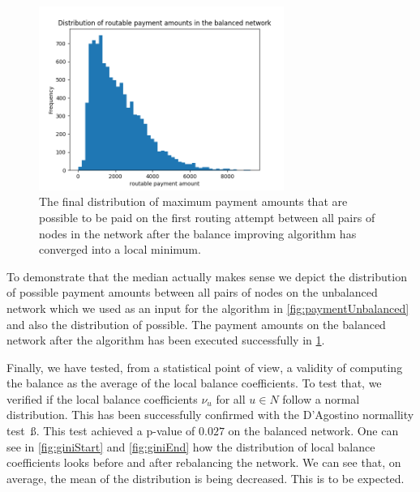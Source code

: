 \documentclass[a4paper]{paper}
\begin{document}
\begin{figure}
 \centering
 \includegraphics[width=8cm]{code/results/routabilityTest/paymentamtBalanced.png}
 \caption{The final distribution of maximum payment amounts that are possible to be paid on the first routing attempt between all pairs of nodes in the network after the balance improving algorithm has converged into a local minimum.}
 \label{fig:paymentBalanced}
\end{figure}

To demonstrate that the median actually makes sense we depict 
the distribution of possible payment amounts between all pairs
of nodes on the unbalanced network which we used as an input for 
the algorithm in \cref{fig:paymentUnbalanced} and also the distribution of possible. 
The payment amounts on the balanced network after the algorithm has been executed 
successfully in \cref{fig:paymentBalanced}.

Finally, we have tested, from a statistical point of view, a validity of computing the balance as the average of the local balance coefficients.
To test that, we verified if the local balance coefficients $\nu_u$ for all $u \in N$ follow a normal distribution. This has been successfully confirmed with the D'Agostino normallity test~ß\cite{d1971omnibus}.
This test achieved a p-value of $0.027$ on the balanced network.
One can see in \cref{fig:giniStart} and \cref{fig:giniEnd} how the distribution of local balance coefficients looks before and after rebalancing the network. We can see that, on average, the mean of the distribution is being decreased. This is to be expected. 
\end{document}
